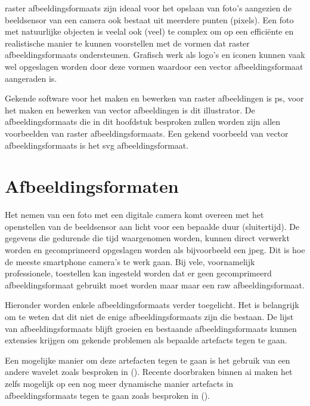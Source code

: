 \Gls{raster} \glspl{afbeeldingsformaat} zijn ideaal voor het opslaan van foto's aangezien de beeldsensor van een camera ook bestaat uit meerdere punten (pixels). Een foto met natuurlijke objecten is veelal ook (veel) te complex om op een efficiënte en realistische manier te kunnen voorstellen met de vormen dat \gls{raster} \glspl{afbeeldingsformaat}  ondersteunen. Grafisch werk als logo's en iconen kunnen vaak wel opgeslagen worden door deze vormen waardoor een \gls{vector} \gls{afbeeldingsformaat} aangeraden is.

Gekende software voor het maken en bewerken van \gls{raster} afbeeldingen is \gls{ps}, voor het maken en bewerken van \gls{vector} afbeeldingen is dit \gls{illustrator}. De \glspl{afbeeldingsformaat} die in dit hoofdstuk besproken zullen worden zijn allen voorbeelden van \gls{raster} \glspl{afbeeldingsformaat}. Een gekend voorbeeld van \gls{vector} \glspl{afbeeldingsformaat} is het \gls{svg} \gls{afbeeldingsformaat}.

\section{Afbeeldingsformaten}
\label{sec:afbeeldingscompressie-afbeeldingsformaten}

Het nemen van een foto met een digitale camera komt overeen met het openstellen van de beeldsensor aan licht voor een bepaalde duur (sluitertijd). De gegevens die gedurende die tijd waargenomen worden, kunnen direct verwerkt worden en gecomprimeerd opgeslagen worden als bijvoorbeeld een \gls{jpeg}. Dit is hoe de meeste smartphone camera’s te werk gaan. Bij vele, voornamelijk professionele, toestellen kan ingesteld worden dat er geen gecomprimeerd \gls{afbeeldingsformaat} gebruikt moet worden maar maar een \gls{raw} \gls{afbeeldingsformaat}. 

Hieronder worden enkele \glspl{afbeeldingsformaat} verder toegelicht. Het is belangrijk om te weten dat dit niet de enige \glspl{afbeeldingsformaat} zijn die bestaan. De lijst van \glspl{afbeeldingsformaat} blijft groeien en bestaande \glspl{afbeeldingsformaat} kunnen extensies krijgen om gekende problemen als bepaalde \glspl{artefact} tegen te gaan. 

Een mogelijke manier om deze artefacten tegen te gaan is het gebruik van een andere \gls{wavelet} zoals besproken in  (\cite{inproceedings}). Recente doorbraken binnen \gls{ai} maken het zelfs mogelijk op een nog meer dynamische manier \glspl{artefact} in \glspl{afbeeldingsformaat} tegen te gaan zoals besproken in  (\cite{jpegartefactereductionai}).


